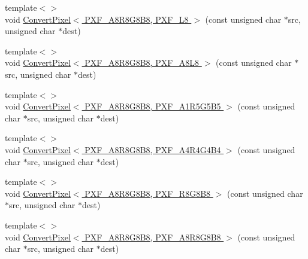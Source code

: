 \begin{DoxyCompactItemize}
{\footnotesize template$<$$>$ }\\void \hyperlink{_convert_pixel_8inl_a48f5312a75f47b2f380f8c9988675ed9}{Convert\-Pixel$<$ P\-X\-F\-\_\-\-A8\-R8\-G8\-B8, P\-X\-F\-\_\-\-L8 $>$} (const unsigned char $\ast$src, unsigned char $\ast$dest)
\item 
{\footnotesize template$<$$>$ }\\void \hyperlink{_convert_pixel_8inl_a0eb24381cc789044729013cec394f840}{Convert\-Pixel$<$ P\-X\-F\-\_\-\-A8\-R8\-G8\-B8, P\-X\-F\-\_\-\-A8\-L8 $>$} (const unsigned char $\ast$src, unsigned char $\ast$dest)
\item 
{\footnotesize template$<$$>$ }\\void \hyperlink{_convert_pixel_8inl_ae5ea2bf8495c23fbfb76000ea69f0250}{Convert\-Pixel$<$ P\-X\-F\-\_\-\-A8\-R8\-G8\-B8, P\-X\-F\-\_\-\-A1\-R5\-G5\-B5 $>$} (const unsigned char $\ast$src, unsigned char $\ast$dest)
\item 
{\footnotesize template$<$$>$ }\\void \hyperlink{_convert_pixel_8inl_a2b0f640950df7166465be83a229a6176}{Convert\-Pixel$<$ P\-X\-F\-\_\-\-A8\-R8\-G8\-B8, P\-X\-F\-\_\-\-A4\-R4\-G4\-B4 $>$} (const unsigned char $\ast$src, unsigned char $\ast$dest)
\item 
{\footnotesize template$<$$>$ }\\void \hyperlink{_convert_pixel_8inl_af2947ef1a294a4d9eff8fb1affe1372d}{Convert\-Pixel$<$ P\-X\-F\-\_\-\-A8\-R8\-G8\-B8, P\-X\-F\-\_\-\-R8\-G8\-B8 $>$} (const unsigned char $\ast$src, unsigned char $\ast$dest)
\item 
{\footnotesize template$<$$>$ }\\void \hyperlink{_convert_pixel_8inl_aa1d27fcb1c6c3789b977d97697ff7460}{Convert\-Pixel$<$ P\-X\-F\-\_\-\-A8\-R8\-G8\-B8, P\-X\-F\-\_\-\-A8\-R8\-G8\-B8 $>$} (const unsigned char $\ast$src, unsigned char $\ast$dest)
\end{DoxyCompactItemize}


